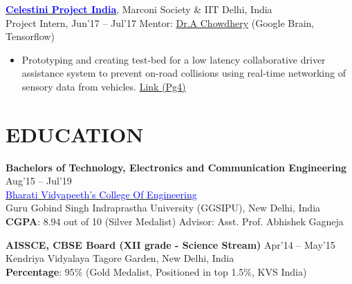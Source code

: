 \documentclass[11pt]{res} %
\newcommand{\titlegap}{5pt} %
\newcommand{\sectgap}{0.05in} %
\begin{document}
\begin{resume}
\href{https://www.marconisociety.org/programs-services/}{\textbf{\textcolor{blue}{Celestini Project India}}}, Marconi Society \& IIT Delhi, India\\
Project Intern, Jun'17 – Jul'17 \hfill Mentor: \href{https://achowdhery.github.io/achowdhery-website/index.html}{Dr.A Chowdhery} (Google Brain, Tensorflow)
\begin{itemize}
\item Prototyping and creating test-bed for a low latency collaborative driver assistance system to prevent on-road collisions using real-time networking of sensory data from vehicles. \textcolor{blue}{\href{https://bhartischool.iitd.ac.in/pdf/7thISSUEnewsletter.pdf}{Link (Pg4)}}
\end{itemize}


\vspace{\sectgap}
\hline
\section{EDUCATION} %

\vspace{\titlegap}

{\bf Bachelors of Technology, Electronics and Communication Engineering} \hfill Aug'15 -- Jul'19 \\ 
\href{http://bvcoend.ac.in}{\textcolor{blue}{Bharati Vidyapeeth's College Of Engineering}}\\
Guru Gobind Singh Indraprastha University (GGSIPU), New Delhi, India \\
\textbf{CGPA}: 8.94 out of 10 (Silver Medalist) \hspace{0.2in}
\hfill Advisor: Asst. Prof. Abhishek Gagneja

{\bf AISSCE, CBSE Board (XII grade - Science Stream)} \hfill Apr'14 -- May'15 \\ 
Kendriya Vidyalaya Tagore Garden, New Delhi, India\\
\textbf{Percentage}: 95\% (Gold Medalist, Positioned in top 1.5\%, KVS India)

\vspace{\sectgap}
\hline

\end{resume}
\end{document}
